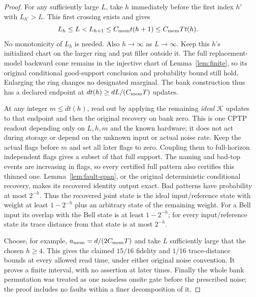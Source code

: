 \begin{proof}
For any sufficiently large $L$, take $h$ immediately before the first index $h'$ with $L_{h'}>L$. This first crossing exists and gives
\[
 L_h\le L<L_{h+1}\le C_{\rm mem}t(h+1)
 \le C_{\rm mem}Tt(h).
\]
No monotonicity of $L_h$ is needed. Also $h\to\infty$ as $L\to\infty$. Keep this $h$'s initialized chart on the larger ring and put filler outside it. The full replacement-model backward cone remains in the injective chart of Lemma~\ref{lem:finite}, so its original conditional good-support conclusion and probability bound still hold. Enlarging the ring changes no designated marginal. The bank construction thus has a declared endpoint at $dt(h)\ge dL/(C_{\rm mem}T)$ updates.

At any integer $m\le dt(h)$, read out by applying the remaining \emph{ideal} $\mathcal K$ updates to that endpoint and then the original recovery on bank zero. This is one CPTP readout depending only on $L,h,m$ and the known hardware; it does not act during storage or depend on the unknown input or actual noise rate. Keep the actual flags before $m$ and set all later flags to zero. Coupling them to full-horizon independent flags gives a subset of that full support. The naming and bad-top events are increasing in flags, so every certified full pattern also certifies this thinned one. Lemma~\ref{lem:fault-span}, or the original deterministic conditional recovery, makes its recovered identity output exact. Bad patterns have probability at most $2^{-h}$. Thus the recovered joint state is the ideal input/reference state with weight at least $1-2^{-h}$ plus an arbitrary state of the remaining weight. For a Bell input its overlap with the Bell state is at least $1-2^{-h}$; for every input/reference state its trace distance from that state is at most $2^{-h}$.

Choose, for example, $a_{\rm mem}=d/(2C_{\rm mem}T)$ and take $L$ sufficiently large that the chosen $h\ge4$. This gives the claimed $15/16$ fidelity and $1/16$ trace-distance bounds at every allowed read time, under either original noise convention. It proves a finite interval, with no assertion at later times. Finally the whole bank permutation was treated as one noiseless onsite gate before the prescribed noise; the proof includes no faults within a finer decomposition of it.
\end{proof}
